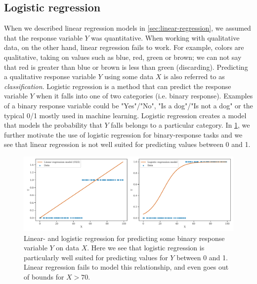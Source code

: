 \subsection{Logistic regression}
\label{sec:logistic-regression}
When we described linear regression models in \cref{sec:linear-regression}, we assumed that the response variable $Y$ was quantitative. When working with qualitative data, on the other hand, linear regression fails to work. For example, colors are qualitative, taking on values such as blue, red, green or brown; we can not say that red is greater than blue or brown is less than green (discarding). Predicting a qualitative response variable $Y$ using some data $X$ is also referred to as \textit{classification}. Logistic regression is a method that can predict the response variable $Y$ when it falls into one of two categories (i.e. binary response). Examples of a binary response variable could be "Yes"/"No", "Is a dog"/"Is not a dog" or the typical 0/1 mostly used in machine learning. Logistic regression creates a model that models the probability that $Y$ falls belongs to a particular category. In \cref{fig:logistic-regression-example}, we further motivate the use of logistic regression for binary-response tasks and we see that linear regression is not well suited for predicting values between 0 and 1.
\begin{figure}[H]
    \centering
    \includegraphics[width=\textwidth]{thesis/figures/logistic-regression-example.pdf}
    \caption{Linear- and logistic regression for predicting some binary response variable $Y$ on data $X$. Here we see that logistic regression is particularly well suited for predicting values for $Y$ between 0 and 1. Linear regression fails to model this relationship, and even goes out of bounds for $X > 70$.}
    \label{fig:logistic-regression-example}
\end{figure}

